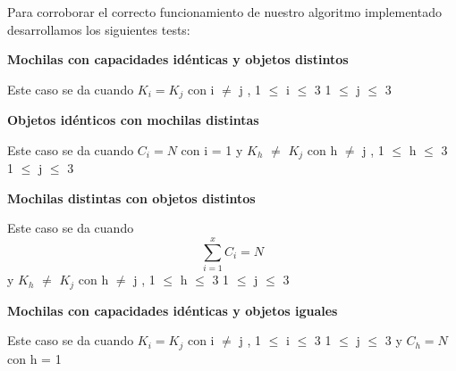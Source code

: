 \indent Para corroborar el correcto funcionamiento de nuestro algoritmo implementado desarrollamos los siguientes tests:\\


\begin{center}
 \textbf{Mochilas con capacidades id\'enticas y objetos distintos}
\end{center}

Este caso se da cuando $K_{i} = K_{j}$ con i $\neq$ j , 1 $\leq$ i $\leq$ 3  1 $\leq$ j $\leq$ 3  \\

\begin{center}
 \textbf{Objetos id\'enticos con mochilas distintas}
\end{center}

Este caso se da cuando $C_{i} = N$ con i = 1 y $K_{h}$ $\neq$ $K_{j}$ con h $\neq$ j , 1 $\leq$ h $\leq$ 3  1 $\leq$ j $\leq$ 3 \\

\begin{center}
 \textbf{Mochilas distintas con objetos distintos}
\end{center}

Este caso se da cuando \[
\sum_{i=1}^{x}C_{i}=N 
\]  y $K_{h}$ $\neq$ $K_{j}$ con h $\neq$ j , 1 $\leq$ h $\leq$ 3  1 $\leq$ j $\leq$ 3 \\


\begin{center}
 \textbf{Mochilas con capacidades id\'enticas y objetos iguales}
\end{center}

Este caso se da cuando $K_{i} = K_{j}$ con i $\neq$ j , 1 $\leq$ i $\leq$ 3  1 $\leq$ j $\leq$ 3  y $C_{h} = N$ con h = 1\\

